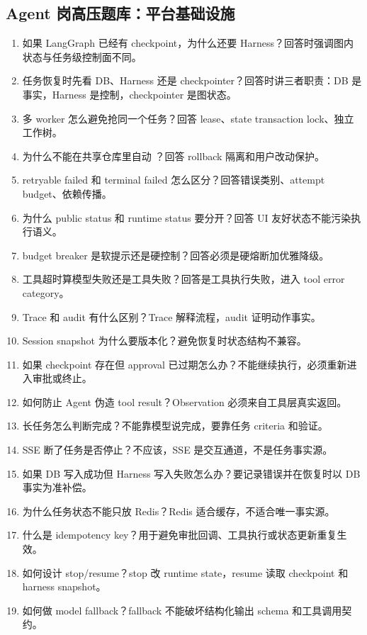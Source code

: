 \subsection{Agent 岗高压题库：平台基础设施}
\begin{enumerate}[leftmargin=2em]
  \item 如果 LangGraph 已经有 checkpoint，为什么还要 Harness？回答时强调图内状态与任务级控制面不同。
  \item 任务恢复时先看 DB、Harness 还是 checkpointer？回答时讲三者职责：DB 是事实，Harness 是控制，checkpointer 是图状态。
  \item 多 worker 怎么避免抢同一个任务？回答 lease、state transaction lock、独立工作树。
  \item 为什么不能在共享仓库里自动 ？回答 rollback 隔离和用户改动保护。
  \item retryable failed 和 terminal failed 怎么区分？回答错误类别、attempt budget、依赖传播。
  \item 为什么 public status 和 runtime status 要分开？回答 UI 友好状态不能污染执行语义。
  \item budget breaker 是软提示还是硬控制？回答必须是硬熔断加优雅降级。
  \item 工具超时算模型失败还是工具失败？回答是工具执行失败，进入 tool error category。
  \item Trace 和 audit 有什么区别？Trace 解释流程，audit 证明动作事实。
  \item Session snapshot 为什么要版本化？避免恢复时状态结构不兼容。
  \item 如果 checkpoint 存在但 approval 已过期怎么办？不能继续执行，必须重新进入审批或终止。
  \item 如何防止 Agent 伪造 tool result？Observation 必须来自工具层真实返回。
  \item 长任务怎么判断完成？不能靠模型说完成，要靠任务 criteria 和验证。
  \item SSE 断了任务是否停止？不应该，SSE 是交互通道，不是任务事实源。
  \item 如果 DB 写入成功但 Harness 写入失败怎么办？要记录错误并在恢复时以 DB 事实为准补偿。
  \item 为什么任务状态不能只放 Redis？Redis 适合缓存，不适合唯一事实源。
  \item 什么是 idempotency key？用于避免审批回调、工具执行或状态更新重复生效。
  \item 如何设计 stop/resume？stop 改 runtime state，resume 读取 checkpoint 和 harness snapshot。
  \item 如何做 model fallback？fallback 不能破坏结构化输出 schema 和工具调用契约。

\end{enumerate}
